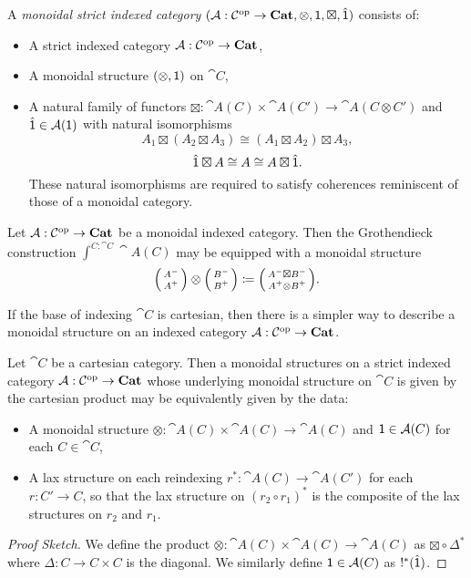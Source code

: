 \documentclass[DynamicalBook]{subfiles}
\begin{document}
\begin{definition}\label{def.monoidal_indexed}
A \emph{monoidal strict indexed category} $(\mathcal{A} : \mathcal{C}^{\textnormal{op}} \to \textbf{Cat},
\otimes, \mathsf{1}, \boxtimes, \hat{\mathsf{1}})$ consists of:
\begin{itemize}
  \item A strict indexed category $\mathcal{A} : \mathcal{C}^{\textnormal{op}} \to \textbf{Cat}$,
\item A monoidal structure $(\otimes, \mathsf{1})$ on $\cat{C}$,
\item A natural family of functors $\boxtimes : \cat{A}(C) \times \cat{A}(C')
  \to \cat{A}(C \otimes C')$ and $\hat{\mathsf{1}} \in \mathcal{A}(\mathsf{1})$ with natural
  isomorphisms 
$$A_1 \boxtimes (A_2 \boxtimes A_3) \cong (A_1 \boxtimes A_2) \boxtimes A_3,$$
$$\hat{\mathsf{1}} \boxtimes A \cong A \cong A \boxtimes \hat{\mathsf{1}}.$$
These natural isomorphisms are required to satisfy coherences reminiscent of
those of a monoidal category.
\end{itemize}
\end{definition}

\begin{theorem}\label{thm.monoidal_indexed}
Let $\mathcal{A} : \mathcal{C}^{\textnormal{op}} \to \textbf{Cat}$ be a monoidal indexed category. Then
the Grothendieck construction $\int^{C : \cat{C}} \cat{A}(C)$ may be equipped
with a monoidal structure 
$$\lens{A^-}{A^+} \otimes \lens{B^-}{B^+} \coloneqq \lens{A^- \boxtimes B^-}{A^+
\otimes B^+}.$$
\end{theorem}

If the base of indexing $\cat{C}$ is cartesian, then there is a simpler way to
describe a monoidal structure on an indexed category $\mathcal{A} : \mathcal{C}^{\textnormal{op}} \to \textbf{Cat}$.

\begin{theorem}\label{thm.monoidal_indexed_cartesian}
Let $\cat{C}$ be a cartesian category. Then a monoidal structures on a strict indexed
category $\mathcal{A} :
\mathcal{C}^{\textnormal{op}} \to \textbf{Cat}$ whose underlying monoidal structure on $\cat{C}$ is
given by the cartesian product may be equivalently given by the data:
\begin{itemize}
  \item A monoidal structure $\otimes : \cat{A}(C) \times \cat{A}(C) \to
    \cat{A}(C)$ and $\mathsf{1} \in \mathcal{A}(C)$ for each $C \in \cat{C}$, 
  \item A lax structure on each reindexing $r^{\ast} : \cat{A}(C) \to \cat{A}(C')$
    for each $r : C' \to C$, so that the lax structure on $(r_2 \circ
    r_1)^{\ast}$ is the composite of the lax structures on $r_2$ and $r_1$.
\end{itemize}
\end{theorem}
\begin{proof}[Proof Sketch]
We define the product $\otimes : \cat{A}(C) \times \cat{A}(C) \to \cat{A}(C)$ as
$\boxtimes \circ \Delta^{\ast}$ where $\Delta : C \to C \times C$ is the
diagonal. We similarly define $\mathsf{1} \in \mathcal{A}(C)$ as $!^{\ast}(\hat{\mathsf{1}})$.
\end{proof}
\end{document}
